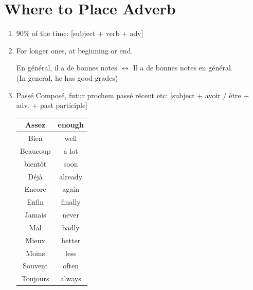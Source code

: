 \documentclass{book}
\begin{document}
    \section{Where to Place Adverb}
        \begin{enumerate}
            \item 90\% of the time: [subject + verb + adv] 
            \item For longer ones, at beginning or end.
                \begin{center}
                    En général, il a de bonnes notes $\leftrightarrow$ Il a de bonnes notes en général. \\
                    (In general, he has good grades)
                \end{center}
            \item Passé Composé, futur prochem passé récent etc: [subject + avoir / être + adv. + past participle]
                \begin{center}
                    \begin{tabular}{|c|c|}
                        \hline
                        Assez & enough \\
                        \hline
                        Bien & well \\
                        \hline
                        Beaucoup & a lot \\
                        \hline
                        bientôt & soon \\
                        \hline
                        Déjà & already \\
                        \hline
                        Encore & again \\
                        \hline
                        Enfin & finally \\
                        \hline
                        Jamais & never \\
                        \hline
                        Mal & badly \\
                        \hline
                        Mieux & better \\
                        \hline
                        Moins & less \\
                        \hline
                        Souvent & often \\
                        \hline
                        Toujours & always \\
                        \hline

\end{tabular}
\end{center}
\end{enumerate}
\end{document}
